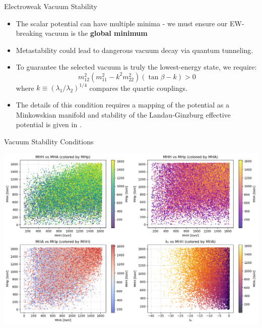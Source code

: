 \documentclass{../bredelebeamer}
\begin{document}
\begin{frame}{Electroweak Vacuum Stability}

\begin{itemize}
    \item The scalar potential can have multiple minima - we must ensure our EW-breaking vacuum is the \textbf{global minimum}\vfill
    
    \item Metastability could lead to dangerous vacuum decay via quantum tunneling.\vfill
    
    \item To guarantee the selected vacuum is truly the lowest-energy state, we require:
    \begin{equation*}
    m_{12}^2\left(m_{11}^2 - k^2 m_{22}^2\right)\left(\tan\beta - k\right) > 0
    \end{equation*}
    where $k \equiv (\lambda_1/\lambda_2)^{1/4}$ compares the quartic couplings. \vfill

    \item The details of this condition requires a mapping of the potential as a Minkowskian manifold and stability of the Landau-Ginzburg effective potential is given in \cite{Barroso:2013awa}.
\end{itemize}

\end{frame}
\begin{frame}{Vacuum Stability Conditions}
  \begin{center}
    \includegraphics[width=\textwidth]{vacuum_stable_THDM_param_scan_analysis}
  \end{center}
    
\end{frame}
\end{document}
